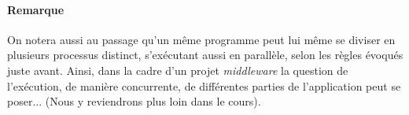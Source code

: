 {    \paragraph{Remarque} On notera aussi au passage qu'un même programme peut lui même se diviser en
    plusieurs processus distinct, s'exécutant aussi en parallèle, selon les règles évoqués juste
    avant. Ainsi, dans la cadre d'un projet \textit{middleware} la question de l'exécution, de
    manière concurrente, de différentes parties de l'application peut se poser... (Nous y
    reviendrons plus loin dans le cours).
}


